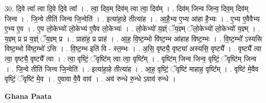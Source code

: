 \documentclass[17pt]{extarticle}
\begin{document}
30. दि॒वे त्वा᳚ त्वा दि॒वे दि॒वे त्वा᳚ । . त्वा॒ दिव॒म् दिव॑म् त्वा त्वा॒ दिव᳚म् । . दिव॑म् जिन्व जिन्व॒ दिव॒म् दिव॑म् जिन्व । . जि॒न्वे तीति॑ जिन्व जि॒न्वेति॑ । . इत्या॑हा॒हे तीत्या॑ह । . आ॒है॒भ्य ए॒भ्य आ॑हा है॒भ्यः । . ए॒भ्य ए॒वैवैभ्य ए॒भ्य ए॒व । . ए॒व लो॒केभ्यो॑ लो॒केभ्य॑ ए॒वैव लो॒केभ्यः॑ । . लो॒केभ्यो॑ य॒ज्ञ्ं ॅय॒ज्ञ्म् ॅलो॒केभ्यो॑ लो॒केभ्यो॑ य॒ज्ञ्म् । . य॒ज्ञ्म् प्र प्र य॒ज्ञ्ं ॅय॒ज्ञ्म् प्र । . प्राहा॑ह॒ प्र प्राह॑ । . आ॒ह॒ वि॒ष्ट॒म्भो वि॑ष्ट॒म्भ आ॑हाह विष्ट॒म्भः । . वि॒ष्ट॒म्भो᳚ ऽस्यसि विष्ट॒म्भो वि॑ष्ट॒म्भो॑ ऽसि । . वि॒ष्ट॒म्भ इति॑ वि - स्त॒म्भः । . अ॒सि॒ वृष्ट्यै॒ वृष्ट्या॑ अस्यसि॒ वृष्ट्यै᳚ । . वृष्ट्यै᳚ त्वा त्वा॒ वृष्ट्यै॒ वृष्ट्यै᳚ त्वा । . त्वा॒ वृष्टिं॒ ॅवृष्टि॑म् त्वा त्वा॒ वृष्टि᳚म् । . वृष्टि॑म् जिन्व जिन्व॒ वृष्टिं॒ ॅवृष्टि॑म् जिन्व । . जि॒न्वे तीति॑ जिन्व जि॒न्वेति॑ । . इत्या॑हा॒हे तीत्या॑ह । . आ॒ह॒ वृष्टिं॒ ॅवृष्टि॑ माहाह॒ वृष्टि᳚म् । . वृष्टि॑ मे॒वैव वृष्टिं॒ ॅवृष्टि॑ मे॒व । . ए॒वावा वै॒वै वाव॑ । . अव॑ रुन्धे रु॒न्धे ऽवाव॑ रुन्धे । \newline

\textbf{Ghana Paata } \newline
\end{document}

